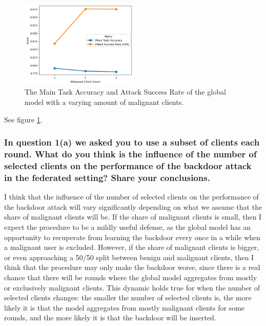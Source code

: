 \documentclass{article}
\begin{document}
\begin{figure}[h]
    \centering
    \includegraphics[width=0.5\textwidth]{malignant_client_count.png}
    \caption{The Main Task Accuracy and Attack Success Rate of the global model with a varying amount of malignant clients.}
    \label{fig:malignant_client_count}
\end{figure}

See figure \ref{fig:malignant_client_count}.

\subsubsection{In question 1(a) we asked you to use a subset of clients each round.
What do you think is the influence of the number of selected clients on the
performance of the backdoor attack in the federated setting? Share your conclusions.}
I think that the influence of the number of selected clients on the performance of the backdoor attack will vary significantly depending on what we assume that the share of malignant clients will be.
If the share of malignant clients is small, then I expect the procedure to be a mildly useful defense, as the global model has an opportunity to recuperate from learning the backdoor every once in a while when a malignant user is excluded.
However, if the share of malignant clients is bigger, or even approaching a 50/50 split between benign and malignant clients, then I think that the procedure may only make the backdoor worse, since there is a real chance that there will be rounds where the global model aggregates from mostly or exclusively malignant clients.
This dynamic holds true for when the number of selected clients changes: the smaller the number of selected clients is, the more likely it is that the model aggregates from mostly malignant clients for some rounds, and the more likely it is that the backdoor will be inserted.
\end{document}
